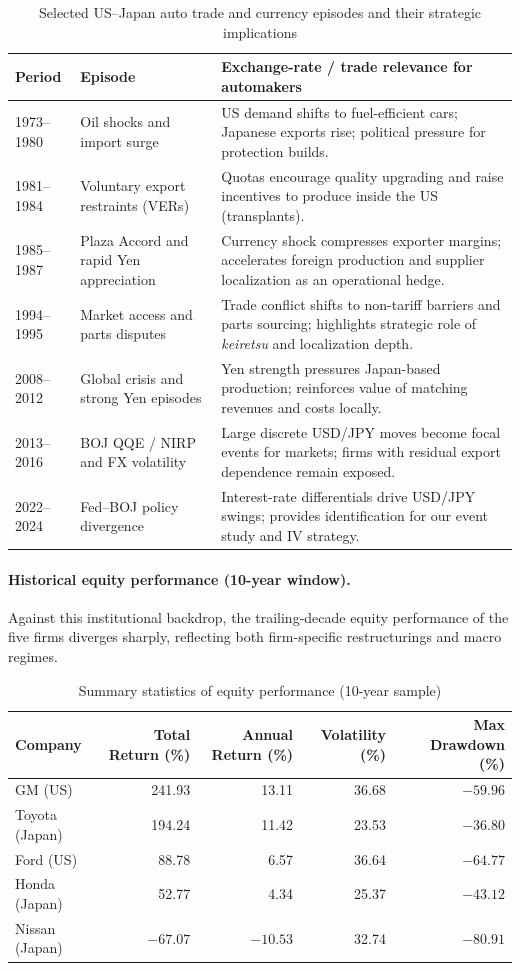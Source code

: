 \documentclass[12pt,a4paper]{article}
\begin{document}
\begin{table}[H]
\centering
\caption{Selected US--Japan auto trade and currency episodes and their strategic implications}
\label{tab:timeline}
\begin{tabular}{p{1.7cm} p{4.0cm} p{7.0cm}}
\toprule
Period & Episode & Exchange-rate / trade relevance for automakers \\
\midrule
1973--1980 & Oil shocks and import surge & US demand shifts to fuel-efficient cars; Japanese exports rise; political pressure for protection builds. \\
1981--1984 & Voluntary export restraints (VERs) & Quotas encourage quality upgrading and raise incentives to produce inside the US (transplants). \\
1985--1987 & Plaza Accord and rapid Yen appreciation & Currency shock compresses exporter margins; accelerates foreign production and supplier localization as an operational hedge. \\
1994--1995 & Market access and parts disputes & Trade conflict shifts to non-tariff barriers and parts sourcing; highlights strategic role of \textit{keiretsu} and localization depth. \\
2008--2012 & Global crisis and strong Yen episodes & Yen strength pressures Japan-based production; reinforces value of matching revenues and costs locally. \\
2013--2016 & BOJ QQE / NIRP and FX volatility & Large discrete USD/JPY moves become focal events for markets; firms with residual export dependence remain exposed. \\
2022--2024 & Fed--BOJ policy divergence & Interest-rate differentials drive USD/JPY swings; provides identification for our event study and IV strategy. \\
\bottomrule
\end{tabular}
\end{table}

\paragraph{Historical equity performance (10-year window).}
Against this institutional backdrop, the trailing-decade equity performance of the five firms diverges sharply, reflecting both firm-specific restructurings and macro regimes.

\begin{table}[H]
\centering
\caption{Summary statistics of equity performance (10-year sample)}
\begin{tabular}{lrrrr}
\toprule
Company & Total Return (\%) & Annual Return (\%) & Volatility (\%) & Max Drawdown (\%) \\
\midrule
GM (US) & 241.93 & 13.11 & 36.68 & $-59.96$ \\
Toyota (Japan) & 194.24 & 11.42 & 23.53 & $-36.80$ \\
Ford (US) & 88.78 & 6.57 & 36.64 & $-64.77$ \\
Honda (Japan) & 52.77 & 4.34 & 25.37 & $-43.12$ \\
Nissan (Japan) & $-67.07$ & $-10.53$ & 32.74 & $-80.91$ \\
\bottomrule
\end{tabular}
\end{table}
\end{document}
